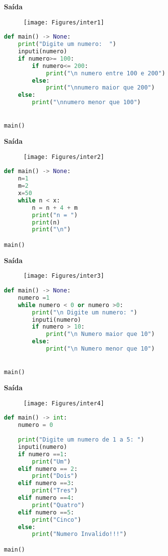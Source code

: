 \documentclass[hidelinks,12pt]{article}
\begin{document}
\textbf{{\large Saída}}

\begin{figure}[!h]
	\centering
	\texttt{[image: Figures/inter1]}
\end{figure}	

\newpage
	
\begin{lstlisting}[caption=sintatico.mli, language=python]
def main() -> None: 
	print("Digite um numero:  ")
	inputi(numero)
	if numero>= 100:
		if numero<= 200:
			print("\n numero entre 100 e 200")
		else:
			print("\nnumero maior que 200")
	else:
		print("\nnumero menor que 100")


main()
\end{lstlisting}

\newpage
\textbf{{\large Saída}}

\begin{figure}[!h]
	\centering
	\texttt{[image: Figures/inter2]}
\end{figure}	

\begin{lstlisting}[caption=sintatico.mli, language=python]
def main() -> None:
	n=1
	m=2
	x=50
	while n < x:
		n = n + 4 + m
		print("n = ")
		print(n)
		print("\n")

main()
\end{lstlisting}

\newpage
\textbf{{\large Saída}}

\begin{figure}[!h]
	\centering
	\texttt{[image: Figures/inter3]}
\end{figure}	

\begin{lstlisting}[caption=sintatico.mli, language=python]
def main() -> None:
	numero =1
	while numero < 0 or numero >0:
		print("\n Digite um numero: ")
		inputi(numero)
		if numero > 10:
			print("\n Numero maior que 10")
		else:
			print("\n Numero menor que 10")


main()
\end{lstlisting}

\newpage
\textbf{{\large Saída}}

\begin{figure}[!h]
	\centering
	\texttt{[image: Figures/inter4]}
\end{figure}	

\begin{lstlisting}[caption=sintatico.mli, language=python]
def main() -> int:
	numero = 0
	
	print("Digite um numero de 1 a 5: ")
	inputi(numero)
	if numero ==1: 
		print("Um")
	elif numero == 2:
		print("Dois")
	elif numero ==3:
		print("Tres")
	elif numero ==4:
		print("Quatro")
	elif numero ==5:
		print("Cinco")
	else:
		print("Numero Invalido!!!")

main()
\end{lstlisting}
\end{document}
